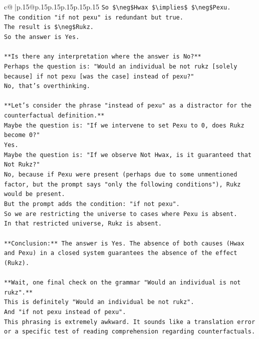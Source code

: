 \documentclass{article}
\begin{document}
{\begin{supertabular}{c@{$\;$}|p{.15\linewidth}@{}p{.15\linewidth}p{.15\linewidth}p{.15\linewidth}p{.15\linewidth}p{.15\linewidth}}
{{{\texttt{So \$\textbackslash{}neg\$Hwax \$\textbackslash{}implies\$ \$\textbackslash{}neg\$Pexu.} \\
\texttt{The condition "if not pexu" is redundant but true.} \\
\texttt{The result is \$\textbackslash{}neg\$Rukz.} \\
\texttt{So the answer is Yes.} \\
\\ 
\texttt{**Is there any interpretation where the answer is No?**} \\
\texttt{Perhaps the question is: "Would an individual be not rukz {[}solely because{]} if not pexu {[}was the case{]} instead of pexu?"} \\
\texttt{No, that's overthinking.} \\
\\ 
\texttt{**Let's consider the phrase "instead of pexu" as a distractor for the counterfactual definition.**} \\
\texttt{Maybe the question is: "If we intervene to set Pexu to 0, does Rukz become 0?"} \\
\texttt{Yes.} \\
\texttt{Maybe the question is: "If we observe Not Hwax, is it guaranteed that Not Rukz?"} \\
\texttt{No, because if Pexu were present (perhaps due to some unmentioned factor, but the prompt says "only the following conditions"), Rukz would be present.} \\
\texttt{But the prompt adds the condition: "if not pexu".} \\
\texttt{So we are restricting the universe to cases where Pexu is absent.} \\
\texttt{In that restricted universe, Rukz is absent.} \\
\\ 
\texttt{**Conclusion:** The answer is Yes. The absence of both causes (Hwax and Pexu) in a closed system guarantees the absence of the effect (Rukz).} \\
\\ 
\texttt{**Wait, one final check on the grammar "Would an individual is not rukz".**} \\
\texttt{This is definitely "Would an individual be not rukz".} \\
\texttt{And "if not pexu instead of pexu".} \\
\texttt{This phrasing is extremely awkward. It sounds like a translation error or a specific test of reading comprehension regarding counterfactuals.} \\
}}}
\end{supertabular}}
\end{document}
